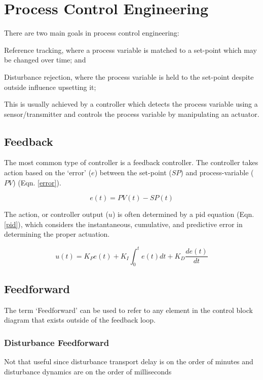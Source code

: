 \chapter{Process Control Engineering}
\label{Chapter:Controls}

There are two main goals in process control engineering:
\begin{enumerate*}[label=\arabic*)]
    \item Reference tracking, where a process variable is matched to a set-point which may be changed over time; and 
    \item Disturbance rejection, where the process variable is held to the set-point despite outside influence upsetting it;
\end{enumerate*}
This is usually achieved by a controller which detects the process variable using a sensor/transmitter and controls the process variable by manipulating an actuator. 

\section{Feedback}
The most common type of controller is a feedback controller. The controller takes action based on the `error' ($e$) between the set-point ($SP$) and process-variable ($PV$) (Eqn. \ref{error}).

\begin{equation}\label{error}
    e(t) = PV(t) - SP(t)
\end{equation}

The action, or controller output ($u$) is often determined by a \acf{pid} equation (Eqn. \ref{pid}), which considers the instantaneous, cumulative, and predictive error in determining the proper actuation. 

\begin{equation}\label{pid}
    u(t) = K_P e(t) + K_I \int_0^t e(t)dt + K_D \frac{de(t)}{dt}
\end{equation}

\section{Feedforward}
The term `Feedforward' can be used to refer to any element in the control block diagram that exists outside of the feedback loop.

\subsection{Disturbance Feedforward}
Not that useful since disturbance transport delay is on the order of minutes and disturbance dynamics are on the order of milliseconds

